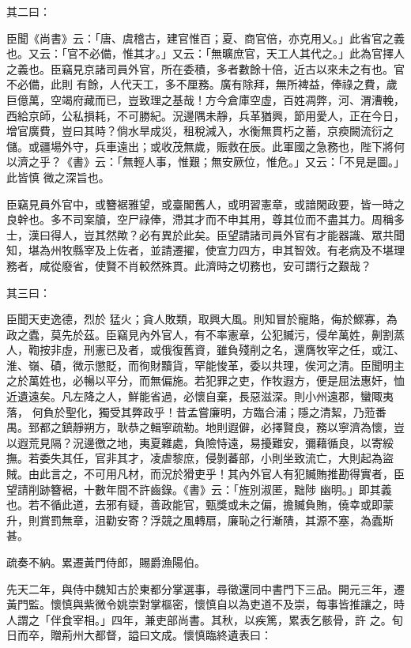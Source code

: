 \begin{pinyinscope}
 其二曰：



 臣聞《尚書》云：「唐、虞稽古，建官惟百；夏、商官倍，亦克用乂。」此省官之義也。又云：「官不必備，惟其才。」又云：「無曠庶官，天工人其代之。」此為官擇人之義也。臣竊見京諸司員外官，所在委積，多者數餘十倍，近古以來未之有也。官不必備，此則
 有餘，人代天工，多不厘務。廣有除拜，無所裨益，俸祿之費，歲巨億萬，空竭府藏而已，豈致理之基哉！方今倉庫空虛，百姓凋弊，河、渭漕輓，西給京師，公私損耗，不可勝紀。況邊隅未靜，兵革猶興，節用愛人，正在今日，增官廣費，豈曰其時？倘水旱成災，租稅減入，水衡無貫朽之蓄，京瘐闕流衍之儲。或疆場外守，兵車遠出；或收茂無歲，賑救在辰。此軍國之急務也，陛下將何以濟之乎？《書》云：「無輕人事，惟艱；無安厥位，惟危。」又云：「不見是圖。」此皆慎
 微之深旨也。



 臣竊見員外官中，或簪裾雅望，或臺閣舊人，或明習憲章，或諳閑政要，皆一時之良幹也。多不司案牘，空尸祿俸，滯其才而不申其用，尊其位而不盡其力。周稱多士，漢曰得人，豈其然歟？必有異於此矣。臣望請諸司員外官有才能器識、眾共聞知，堪為州牧縣宰及上佐者，並請遷擢，使宣力四方，申其智效。有老病及不堪理務者，咸從廢省，使賢不肖較然殊貫。此濟時之切務也，安可謂行之艱哉？



 其三曰：



 臣聞天吏逸德，烈於
 猛火；貪人敗類，取興大風。則知冒於寵賂，侮於鰥寡，為政之蠹，莫先於茲。臣竊見內外官人，有不率憲章，公犯贓污，侵牟萬姓，劓割蒸人，鞫按非虛，刑憲已及者，或俄復舊資，雖負殘削之名，還膺牧宰之任，或江、淮、嶺、磧，微示懲貶，而徇財黷貨，罕能悛革，委以共理，俟河之清。臣聞明主之於萬姓也，必暢以平分，而無偏施。若犯罪之吏，作牧遐方，便是屈法惠奸，恤近遺遠矣。凡左降之人，鮮能省過，必懷自棄，長惡滋深。則小州遠郡，蠻陬夷落，
 何負於聖化，獨受其弊政乎！昔孟嘗廉明，方臨合浦；隱之清絜，乃蒞番禺。郅都之鎮靜朔方，耿恭之輯寧疏勒。地則遐僻，必擇賢良，務以寧濟為懷，豈以遐荒見隔？況邊徼之地，夷夏雜處，負險恃遠，易擾難安，彌藉循良，以寄綏撫。若委失其任，官非其才，凌虐黎庶，侵剝蕃部，小則坐致流亡，大則起為盜賊。由此言之，不可用凡材，而況於猾吏乎！其內外官人有犯贓賄推勘得實者，臣望請削跡簪裾，十數年間不許齒錄。《書》云：「旌別淑匿，黜陟
 幽明。」即其義也。若不循此道，去邪有疑，善政能官，甄獎或未之偏，擔贓負賄，僥幸或即蒙升，則賞罰無章，沮勸安寄？浮競之風轉扇，廉恥之行漸隤，其源不塞，為蠹斯甚。



 疏奏不納。累遷黃門侍郎，賜爵漁陽伯。



 先天二年，與侍中魏知古於東都分掌選事，尋徵還同中書門下三品。開元三年，遷黃門監。懷慎與紫微令姚崇對掌樞密，懷慎自以為吏道不及崇，每事皆推讓之，時人謂之「伴食宰相。」四年，兼吏部尚書。其秋，以疾篤，累表乞骸骨，許
 之。旬日而卒，贈荊州大都督，謚曰文成。懷慎臨終遺表曰：




\end{pinyinscope}
